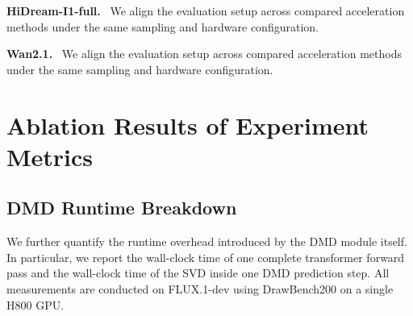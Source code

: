 \textbf{HiDream-I1-full.}~\cite{hidreami1technicalreport}
We align the evaluation setup across compared acceleration methods
under the same sampling and hardware configuration.

\textbf{Wan2.1.}~\cite{wan2025}
We align the evaluation setup across compared acceleration methods
under the same sampling and hardware configuration.



% 


\section{%
Ablation Results of Experiment Metrics
}

\subsection{DMD Runtime Breakdown}\label{app:DMD runtime breakdown}

We further quantify the runtime overhead introduced by the DMD module itself.
In particular,
we report the wall-clock time of one complete transformer forward pass
and the wall-clock time of the SVD inside one DMD prediction step.
All measurements are conducted on FLUX.1-dev
using DrawBench200 on a single H800 GPU.

